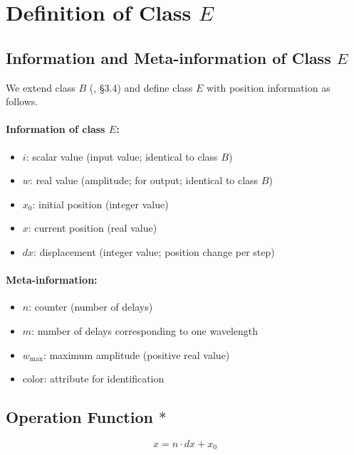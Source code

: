 \documentclass[12pt,a4paper]{article}
\begin{document}
\section{Definition of Class $E$}

\subsection{Information and Meta-information of Class $E$}

We extend class $B$ (\cite{ref3}, \S3.4) and define class $E$ with position information as follows.

\paragraph{Information of class $E$:}

\begin{itemize}
  \item $i$: scalar value (input value; identical to class $B$)
  \item $w$: real value (amplitude; for output; identical to class $B$)
  \item $x_0$: initial position (integer value)
  \item $x$: current position (real value)
  \item $dx$: displacement (integer value; position change per step)
\end{itemize}

\paragraph{Meta-information:}

\begin{itemize}
  \item $n$: counter (number of delays)
  \item $m$: number of delays corresponding to one wavelength
  \item $w_{\max}$: maximum amplitude (positive real value)
  \item color: attribute for identification
\end{itemize}

\subsection{Operation Function $*$}

\begin{equation}
  x = n \cdot dx + x_0
\end{equation}
\end{document}
